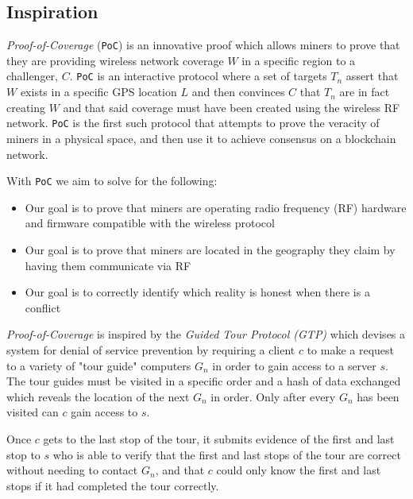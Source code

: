 \documentclass[letterpaper,11pt]{article}
\def\coverage/{$\mathit{W}$}
\def\location/{$\mathit{L}$}
\def\proofofcoverage/{\emph{Proof-of-Coverage}}
\begin{document}
\subsection{Inspiration}

\proofofcoverage/ (\verb|PoC|) is an innovative proof which allows miners to prove that they are providing wireless network coverage \coverage/ in a specific region to a challenger, $\mathit{C}$. \verb|PoC| is an interactive protocol where a set of targets $\mathit{T_n}$ assert that \coverage/ exists in a specific GPS location \location/ and then convinces $\mathit{C}$ that $\mathit{T_n}$ are in fact creating \coverage/ and that said coverage must have been created using the wireless RF network. \verb|PoC| is the first such protocol that attempts to prove the veracity of miners in a physical space, and then use it to achieve consensus on a blockchain network.\newline

With \verb|PoC| we aim to solve for the following:

\begin{itemize}
	\item Our goal is to prove that miners are operating radio frequency (RF) hardware and firmware compatible with the wireless protocol
	\item Our goal is to prove that miners are located in the geography they claim by having them communicate via RF
	\item Our goal is to correctly identify which reality is honest when there is a conflict
\end{itemize}

\proofofcoverage/ is inspired by the \emph{Guided Tour Protocol (GTP)} which devises a system for denial of service prevention by requiring a client $\mathit{c}$ to make a request to a variety of "tour guide" computers $\mathit{G_n}$ in order to gain access to a server $\mathit{s}$. The tour guides must be visited in a specific order and a hash of data exchanged which reveals the location of the next $\mathit{G_n}$ in order. Only after every $\mathit{G_n}$ has been visited can $\mathit{c}$ gain access to $\mathit{s}$.\newline

Once $\mathit{c}$ gets to the last stop of the tour, it submits evidence of the first and last stop to $\mathit{s}$ who is able to verify that the first and last stops of the tour are correct without needing to contact $\mathit{G_n}$, and that $\mathit{c}$ could only know the first and last stops if it had completed the tour correctly.\newline
\end{document}
